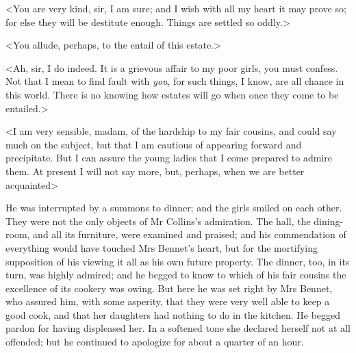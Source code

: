 <You are very kind, sir, I am sure; and I wish with all my heart it may prove so; for else they will be destitute enough. Things are settled so oddly.>

<You allude, perhaps, to the entail of this estate.>

<Ah, sir, I do indeed. It is a grievous affair to my poor girls, you must confess. Not that I mean to find fault with \textit{you}, for such things, I know, are all chance in this world. There is no knowing how estates will go when once they come to be entailed.>

<I am very sensible, madam, of the hardship to my fair cousins, and could say much on the subject, but that I am cautious of appearing forward and precipitate. But I can assure the young ladies that I come prepared to admire them. At present I will not say more, but, perhaps, when we are better acquainted\longdash>

He was interrupted by a summons to dinner; and the girls smiled on each other. They were not the only objects of Mr Collins's admiration. The hall, the dining-room, and all its furniture, were examined and praised; and his commendation of everything would have touched Mrs Bennet's heart, but for the mortifying supposition of his viewing it all as his own future property. The dinner, too, in its turn, was highly admired; and he begged to know to which of his fair cousins the excellence of its cookery was owing. But here he was set right by Mrs Bennet, who assured him, with some asperity, that they were very well able to keep a good cook, and that her daughters had nothing to do in the kitchen. He begged pardon for having displeased her. In a softened tone she declared herself not at all offended; but he continued to apologize for about a quarter of an hour.